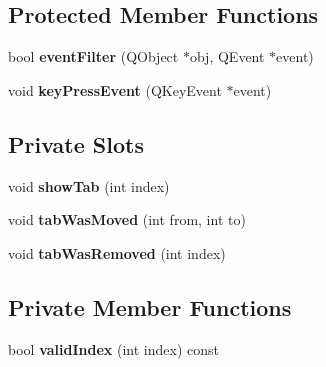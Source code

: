 \subsection*{Protected Member Functions}
\begin{DoxyCompactItemize}
\item 
\hypertarget{class_tab_stacked_widget_a54c4e17b00913256973d890554fab03d}{
bool {\bfseries eventFilter} (QObject $\ast$obj, QEvent $\ast$event)}
\label{class_tab_stacked_widget_a54c4e17b00913256973d890554fab03d}

\item 
\hypertarget{class_tab_stacked_widget_a2ee5e5a190b7c294ecf72e7a75091df8}{
void {\bfseries keyPressEvent} (QKeyEvent $\ast$event)}
\label{class_tab_stacked_widget_a2ee5e5a190b7c294ecf72e7a75091df8}

\end{DoxyCompactItemize}
\subsection*{Private Slots}
\begin{DoxyCompactItemize}
\item 
\hypertarget{class_tab_stacked_widget_a6b1760758e58f1e28762ab1f8bac5eef}{
void {\bfseries showTab} (int index)}
\label{class_tab_stacked_widget_a6b1760758e58f1e28762ab1f8bac5eef}

\item 
\hypertarget{class_tab_stacked_widget_a21355edb24806d536d066b53405af0dc}{
void {\bfseries tabWasMoved} (int from, int to)}
\label{class_tab_stacked_widget_a21355edb24806d536d066b53405af0dc}

\item 
\hypertarget{class_tab_stacked_widget_afb87ed29ff819b1bd3ecea878249a97c}{
void {\bfseries tabWasRemoved} (int index)}
\label{class_tab_stacked_widget_afb87ed29ff819b1bd3ecea878249a97c}

\end{DoxyCompactItemize}
\subsection*{Private Member Functions}
\begin{DoxyCompactItemize}
\item 
\hypertarget{class_tab_stacked_widget_a93ea6c0c29cfe0fa58366726e97a5da2}{
bool {\bfseries validIndex} (int index) const }
\label{class_tab_stacked_widget_a93ea6c0c29cfe0fa58366726e97a5da2}

\end{DoxyCompactItemize}
